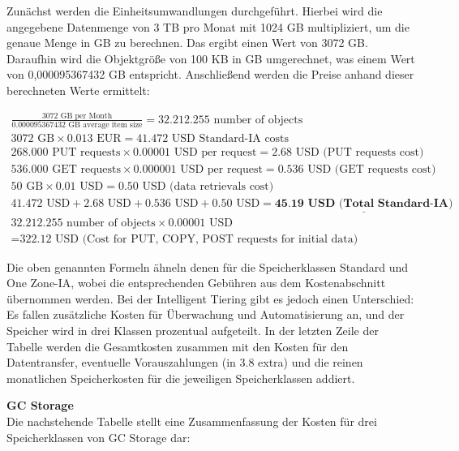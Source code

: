 Zunächst werden die Einheitsumwandlungen durchgeführt. Hierbei wird die angegebene Datenmenge von 3 TB pro Monat mit 1024 GB multipliziert, um die genaue Menge in GB zu berechnen. Das ergibt einen Wert von 3072 GB. Daraufhin wird die Objektgröße von 100 KB in GB umgerechnet, was einem Wert von 0,000095367432 GB entspricht. Anschließend werden die Preise anhand dieser berechneten Werte ermittelt:

\begin{align}
	\frac{3072 \text{ GB per Month}}{0.000095367432 \text{ GB average item size}} = 32.212.255 \text{ number of objects}\\
	3072 \text{ GB} \times 0.013 \text{ EUR} = \text{41.472 USD Standard-IA costs}\\
	268.000 \text{ PUT requests} \times 0.00001 \text{ USD per request} = 2.68 \text{ USD (PUT requests cost)}\\
	536.000 \text{ GET requests} \times 0.000001 \text{ USD per request} = 0.536 \text{ USD (GET requests cost)}\\
	50 \text{ GB} \times 0.01 \text{ USD} = 0.50 \text{ USD (data retrievals cost)}\\
	41.472 \text{ USD} + 2.68 \text{ USD} + 0.536 \text{ USD} + 0.50 \text{ USD} = \underline{\textbf{45.19  USD (Total Standard-IA)}}\\
	32.212.255 \text{ number of objects} \times 0.00001 \text{ USD} \\ = \text{322.12 USD (Cost for PUT, COPY, POST requests for initial data)}
\end{align}

Die oben genannten Formeln ähneln denen für die Speicherklassen Standard und One Zone-IA, wobei die entsprechenden Gebühren aus dem Kostenabschnitt übernommen werden. Bei der Intelligent Tiering gibt es jedoch einen Unterschied: Es fallen zusätzliche Kosten für Überwachung und Automatisierung an, und der Speicher wird in drei Klassen prozentual aufgeteilt. In der letzten Zeile der Tabelle werden die Gesamtkosten zusammen mit den Kosten für den Datentransfer, eventuelle Vorauszahlungen (in 3.8 extra) und die reinen monatlichen Speicherkosten für die jeweiligen Speicherklassen addiert.

\newpage
\textbf{GC Storage}\\

Die nachstehende Tabelle stellt eine Zusammenfassung der Kosten für drei Speicherklassen von GC Storage dar:

